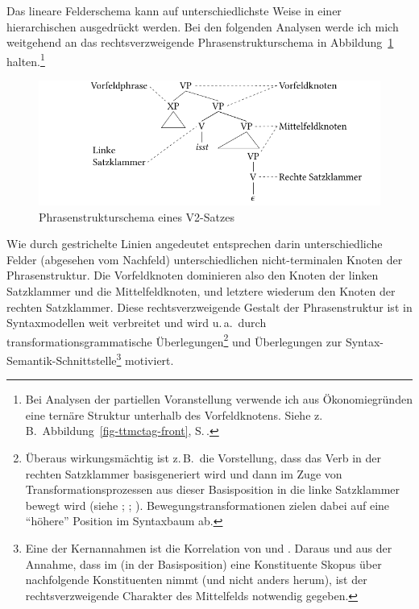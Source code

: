 Das lineare Felderschema kann auf unterschiedlichste Weise in einer hierarchischen  ausgedrückt werden. Bei den folgenden Analysen werde ich mich weitgehend an das rechtsverzweigende Phrasenstrukturschema in Abbildung~\ref{fig-ttmctag-ps-1} halten.\footnote{Bei Analysen der partiellen Voranstellung verwende ich aus Ökonomiegründen eine ternäre Struktur unterhalb des Vorfeldknotens. Siehe z.\,B.\ Abbildung~\ref{fig-ttmctag-front}, S.\,\pageref{fig-ttmctag-front}.}
\begin{figure}[t]
\centering
\includegraphics{graphics/abb75.pdf}
\caption{\label{fig-ttmctag-ps-1} Phrasenstrukturschema eines V2-Satzes}
\end{figure} 
Wie durch gestrichelte Linien angedeutet entsprechen darin unterschiedliche Felder (abgesehen vom Nachfeld) unterschiedlichen nicht-termi\-nalen Knoten der Phrasenstruktur. Die Vorfeldknoten dominieren also den Knoten der linken Satzklammer und die Mittelfeldknoten, und letztere wiederum den Knoten der rechten Satzklammer. Diese rechtsverzweigende Gestalt der Phrasenstruktur ist in Syntaxmodellen weit verbreitet und wird u.\,a.\ durch transformationsgrammatische Überlegungen\footnote{Überaus wirkungsmächtig  ist z.\,B.\ die Vorstellung, dass das Verb in der rechten Satzklammer basisgeneriert wird und dann im Zuge von Transformationsprozessen aus dieser Basisposition in die linke Satzklammer bewegt wird (siehe \citealt[Abschnitt~2.2.2]{Stechow:Sternefeld:88}; \citealt[Abschnitte~III.4 und III.5]{Sternefeld:06}; \citealt[Abschnitt~3.2]{Mueller:10}). Bewegungstransformationen zielen dabei auf eine "`höhere"' Position im Syntaxbaum ab.} und Überlegungen zur Syntax-Semantik-Schnittstelle\footnote{Eine der Kernannahmen ist die Korrelation von  und . Daraus und aus der Annahme, dass im  (in der Basisposition) eine Konstituente Skopus über nachfolgende Konstituenten nimmt (und nicht anders herum), ist der rechtsverzweigende Charakter des Mittelfelds notwendig gegeben.%
} motiviert.

